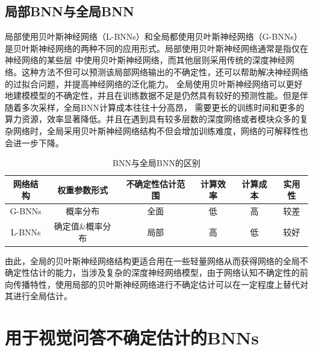 \subsection{局部BNN与全局BNN}
局部使用贝叶斯神经网络（L-BNNs）和全局都使用贝叶斯神经网络（G-BNNs）是贝叶斯神经网络的两种不同的应用形式。局部使用贝叶斯神经网络通常是指仅在神经网络的某些层
中使用贝叶斯神经网络，而其他层则采用传统的深度神经网络。这种方法不但可以预测该局部网络输出的不确定性，还可以帮助解决神经网络的过拟合问题，并提高神经网络的泛化能力。
全局使用贝叶斯神经网络可以更好地建模模型的不确定性，并且在训练数据不足是仍然具有较好的预测性能。但是伴随着多次采样，全局BNN计算成本往往十分高昂，
需要更长的训练时间和更多的算力资源，效率显著降低。并且在遇到具有较多层数的深度网络或者模块众多的复杂网络时，全局采用贝叶斯神经网络结构不但会增加训练难度，网络的可解释性也会进一步下降。
\begin{table}
	\caption{\label{bnn-bnnlr}BNN与全局BNN的区别}
	\centering
	\small %
	\begin{tabular}{c|ccccc}
        \hline 网络结构 & 权重参数形式 & 不确定性估计范围 & 计算效率 & 计算成本 &实用性\\
        \hline G-BNNs & 概率分布 & 全面 & 低 & 高 & 较差\\
		L-BNNs & 确定值\&概率分布 & 局部 & 高 & 低 & 较好\\
        \hline 
        \end{tabular}
\end{table}	
由此，全局的贝叶斯神经网络结构更适合用在一些轻量网络从而获得网络的全局不确定性估计的能力，当涉及复杂的深度神经网络模型，由于网络认知不确定性的前向传播特性\cite{gal2016dropout}，使用局部的贝叶斯神经网络进行不确定估计可以在一定程度上替代对其进行全局估计。

\section{用于视觉问答不确定估计的BNNs}
